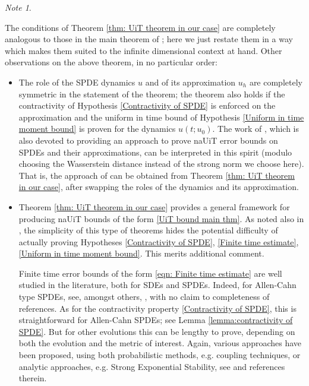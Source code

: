 \documentclass[reqno, 11pt]{amsart}
\theoremstyle{plain}
\theoremstyle{definition}
\theoremstyle{remark}
\newtheorem{note}[theorem]{Note}
\numberwithin{equation}{section}
\numberwithin{theorem}{section}
\begin{document}
{\begin{note}\label{note: comments on main thm}  

The conditions of Theorem \ref{thm: UiT theorem in our case} are completely analogous to those in the main theorem of \cite{schuh2024conditions}; here we just restate them in a way which makes them suited to the infinite dimensional context at hand. Other observations on the above theorem, in no particular order: 
\begin{itemize}
\item  The role of the SPDE dynamics $u$ and of its approximation $u_h$ are completely symmetric in the statement of the theorem; the theorem also holds if the contractivity of  Hypothesis \ref{Contractivity of SPDE} is enforced on the approximation and the uniform in time bound of Hypothesis \ref{Uniform in time moment bound} is proven for the dynamics $u(t; u_0)$. The work of \cite{glatt2024long}, which  is also devoted to providing an approach to prove  naUiT error bounds on SPDEs and their approximations,  can be interpreted in this spirit (modulo choosing the Wasserstein distance instead of the strong norm we choose here). That is, the approach of \cite{glatt2024long} can be obtained from Theorem \ref{thm: UiT theorem in our case}, after swapping the roles of the dynamics and its approximation. 

\item {Theorem \ref{thm: UiT theorem in our case} provides a general framework  for producing naUiT bounds of the form \eqref{UiT bound main thm}. As noted also in \cite{schuh2024conditions, glatt2024long}, the simplicity of this type of theorems hides the potential difficulty of actually proving  Hypotheses \ref{Contractivity of SPDE}, \ref{Finite time estimate}, \ref{Uniform in time moment bound}.  This merits additional comment.}

{Finite time error bounds of the form \eqref{eqn: Finite time estimate} are well studied in the literature, both for SDEs and SPDEs. Indeed, for Allen-Cahn type SPDEs, see, amongst others, \cite{brehier2020weak, brehier2018analysis, cui2019strong, liu2021strong, breit2024weak, cai2021weak, becker2023strong, ma2024strong}, with no claim to completeness of references. As for the contractivity property \ref{Contractivity of SPDE},  this is straightforward for Allen-Cahn SPDEs; see Lemma \ref{lemma:contractivity of SPDE}. {But for other evolutions this can be lengthy to prove, depending on both the evolution and the metric of interest. Again, various approaches have been proposed, using both probabilistic methods, e.g.  coupling techniques, or analytic approaches, e.g. Strong Exponential Stability, see  \cite{Angeli, crisan2022poisson, schuh2024global,liu2025l2, leimkuhler2024contraction, eberle2016reflection, glatt2024long, barrera2024ergodicity} and references therein.}  

}
\end{itemize}
\end{note}}
\end{document}
